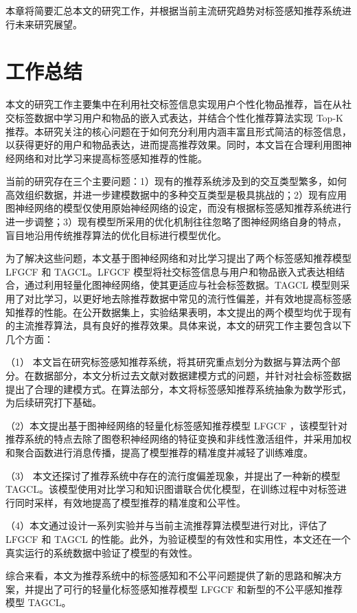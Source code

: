 本章将简要汇总本文的研究工作，并根据当前主流研究趋势对标签感知推荐系统进行未来研究展望。
\section{工作总结}
本文的研究工作主要集中在利用社交标签信息实现用户个性化物品推荐，旨在从社交标签数据中学习用户和物品的嵌入式表达，并结合个性化推荐算法实现 Top-K 推荐。本研究关注的核心问题在于如何充分利用内涵丰富且形式简洁的标签信息，以获得更好的用户和物品表达，进而提高推荐效果。同时，本文旨在合理利用图神经网络和对比学习来提高标签感知推荐的性能。

当前的研究存在三个主要问题：1）现有的推荐系统涉及到的交互类型繁多，如何高效组织数据，并进一步建模数据中的多种交互类型是极具挑战的；2）现有应用图神经网络的模型仅使用原始神经网络的设定，而没有根据标签感知推荐系统进行进一步调整；3）现有模型所采用的优化机制往往忽略了图神经网络自身的特点，盲目地沿用传统推荐算法的优化目标进行模型优化。

为了解决这些问题，本文基于图神经网络和对比学习提出了两个标签感知推荐模型 LFGCF 和 TAGCL。LFGCF 模型将社交标签信息与用户和物品嵌入式表达相结合，通过利用轻量化图神经网络，使其更适应与社会标签数据。TAGCL 模型则采用了对比学习，以更好地去除推荐数据中常见的流行性偏差，并有效地提高标签感知推荐的性能。在公开数据集上，实验结果表明，本文提出的两个模型均优于现有的主流推荐算法，具有良好的推荐效果。具体来说，本文的研究工作主要包含以下几个方面：

（1） 本文旨在研究标签感知推荐系统，将其研究重点划分为数据与算法两个部分。在数据部分，本文分析过去文献对数据建模方式的问题，并针对社会标签数据提出了合理的建模方式。在算法部分，本文将标签感知推荐系统抽象为数学形式，为后续研究打下基础。

（2）本文提出基于图神经网络的轻量化标签感知推荐模型 LFGCF ，该模型针对推荐系统的特点去除了图卷积神经网络的特征变换和非线性激活组件，并采用加权和聚合函数进行消息传播，提高了模型推荐的精准度并减轻了训练难度。

（3） 本文还探讨了推荐系统中存在的流行度偏差现象，并提出了一种新的模型 TAGCL。该模型使用对比学习和知识图谱联合优化模型，在训练过程中对标签进行同时采样，有效地提高了模型推荐的精准度和公平性。

（4）本文通过设计一系列实验并与当前主流推荐算法模型进行对比，评估了 LFGCF 和 TAGCL 的性能。此外，为验证模型的有效性和实用性，本文还在一个真实运行的系统数据中验证了模型的有效性。

综合来看，本文为推荐系统中的标签感知和不公平问题提供了新的思路和解决方案，并提出了可行的轻量化标签感知推荐模型 LFGCF 和新型的不公平感知推荐模型 TAGCL。

